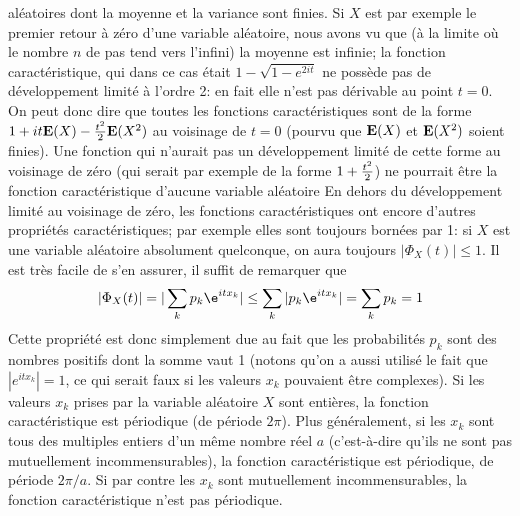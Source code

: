 al\'eatoires dont la moyenne et la variance sont finies. Si $X$ est par
exemple le premier retour \`a z\'ero d'une variable al\'eatoire,  nous 
avons vu que (\`a la limite o\`u le nombre $n$ de pas tend vers l'infini) la
moyenne est infinie; la fonction caract\'eristique, qui dans ce cas \'etait
$1 - \sqrt {1 - e^{2it}}$ ne poss\`ede pas de d\'eveloppement limit\'e \`a
l'ordre 2: en fait elle n'est pas d\'erivable au point $t = 0$.
\medskip
On peut donc dire que toutes les fonctions caract\'eristiques sont de la
forme $1 + it {\bf E} (X) - {t^2 \over 2} {\bf E} (X^2)$ au voisinage de $t =
0$ (pourvu que ${\bf E} (X)$ et ${\bf E} (X^2)$ soient finies). Une fonction
qui n'aurait pas un d\'eveloppement limit\'e de cette forme au voisinage de
z\'ero  (qui serait par exemple de la forme $1 + {t^2 \over 2}$) ne pourrait
\^etre la fonction caract\'eristique d'aucune variable al\'eatoire
\medskip
En dehors du d\'eveloppement limit\'e au voisinage de z\'ero,  les fonctions
caract\'eristiques ont encore d'autres propri\'et\'es caract\'eristiques;
par
exemple elles sont toujours born\'ees par 1:  si $X$ est une variable
al\'eatoire absolument quelconque,  on aura toujours $|\Phi_X(t)| \leq 1$. 
Il
est tr\`es facile de s'en assurer,  il suffit  de remarquer que 
$$|\Phi_X(t)| = | \sum_k p_k \e^{itx_k} | \leq \sum_k |p_k \e^{itx_k}| = 
\sum_k p_k = 1$$ 
Cette propri\'et\'e est donc simplement due au fait que les probabilit\'es
$p_k$ sont des nombres positifs dont la somme vaut 1 (notons qu'on a
aussi utilis\'e le fait que $| e^{itx_k} | = 1$,  ce qui serait faux si les 
valeurs $x_k$ pouvaient \^etre complexes).
\medskip
Si les valeurs $x_k$ prises par la variable al\'eatoire $X$  sont enti\`eres, 
la fonction caract\'eristique est p\'eriodique (de p\'eriode $2\pi$). Plus
g\'en\'eralement, si les $x_k$ sont tous des multiples entiers d'un  m\^eme
nombre r\'eel $a$ (c'est-\`a-dire qu'ils ne sont pas mutuellement
incommensurables), la fonction caract\'eristique est p\'eriodique, de 
p\'eriode $2\pi / a$. Si par contre les $x_k$ sont mutuellement
incommensurables, la fonction caract\'eristique n'est pas p\'eriodique.

